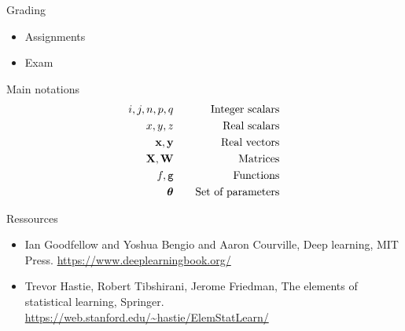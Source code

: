 \documentclass[xcolor=pdftex,dvipsnames,table,mathserif]{beamer}
\begin{document}
\begin{frame}{Grading}

\begin{itemize}
\item Assignments
\item Exam
\end{itemize}

\end{frame}

\begin{frame}{Main notations}
  \begin{eqnarray*}
    i, j, n, p, q & \hspace{1em} & \text{Integer scalars} \\
    x, y, z & \hspace{1em} & \text{Real scalars} \\
    \mathbf{x}, \mathbf{y} & \hspace{1em} & \text{Real vectors} \\
    \mathbf{X}, \mathbf{W} & \hspace{1em} & \text{Matrices} \\
    f, \texttt{g} & \hspace{1em} & \text{Functions} \\
    \boldsymbol{\theta} & \hspace{1em} & \text{Set of parameters} \\
    \end{eqnarray*}
\end{frame}


\begin{frame}{Ressources}

  \begin{itemize}
  \item Ian Goodfellow and Yoshua Bengio and Aaron Courville, Deep learning, MIT Press. \url{https://www.deeplearningbook.org/}

  \item Trevor Hastie, Robert Tibshirani, Jerome Friedman, The elements of statistical learning, Springer. \url{https://web.stanford.edu/~hastie/ElemStatLearn/}

  \end{itemize}
\end{frame}



\end{document}
